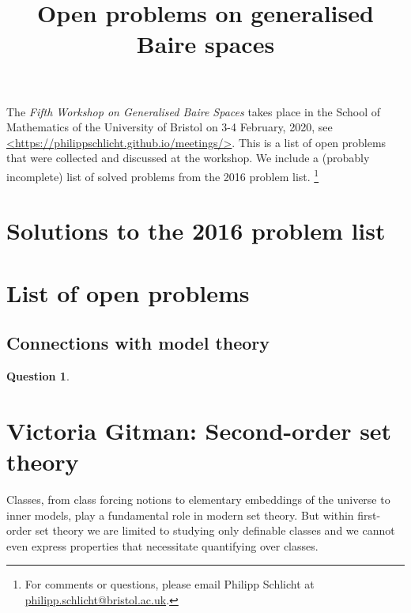 \documentclass{amsart}
\title{Open problems on generalised Baire spaces}
\theoremstyle{definition}
\newtheorem{question}[theorem]{Question}
\begin{document}
\maketitle

The \emph{Fifth Workshop on Generalised Baire Spaces} takes place in the School of Mathematics of the University of Bristol on 3-4 February, 2020, see \url{<https://philippschlicht.github.io/meetings/>}. 
This is a list of open problems that were collected and discussed at the workshop. 
We include a (probably incomplete) list of solved problems from the 2016 problem list. 
\footnote{%
For comments or questions, please email Philipp Schlicht at \href{mailto:philipp.schlicht@bristol.ac.uk} {philipp.schlicht@bristol.ac.uk}.} 


\section{Solutions to the 2016 problem list} 




\section{List of open problems} 

\subsection{Connections with model theory} 

\begin{question} 

\end{question} 





\iffalse 
\newpage 
\section{Victoria Gitman: Second-order set theory}

Classes, from class forcing notions to elementary embeddings of the universe to inner models, play a fundamental role in modern set theory. But within first-order set theory we are limited to studying only definable classes and we cannot even express properties that necessitate quantifying over classes. 
\end{document}
